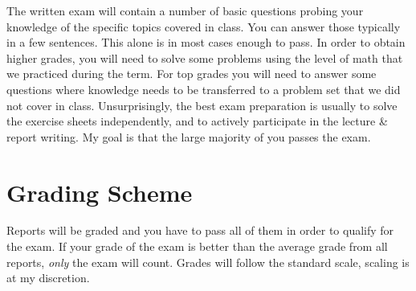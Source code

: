 \documentclass[letterpaper]{inzane_syllabus} %
\begin{document}
The written exam will contain a number of basic questions probing your knowledge of the specific topics covered in class. You can answer those typically in a few sentences. This alone is in most cases enough to pass. In order to obtain higher grades, you will need to solve some problems using the level of math that we practiced during the term. For top grades you will need to answer some questions where knowledge needs to be transferred to a problem set that we did not cover in class. Unsurprisingly, the best exam preparation is usually to solve the exercise sheets independently, and to actively participate in the lecture \& report writing. My goal is that the large majority of you passes the exam.

\section{Grading Scheme}

\begin{twentyshort}
\end{twentyshort}

Reports will be graded and you have to pass all of them in order to qualify for the exam. If your  grade of the exam is better than the average grade from all reports, \textit{only} the exam will count. Grades will follow the standard scale, scaling is at my discretion.



\newpage
\end{document}
